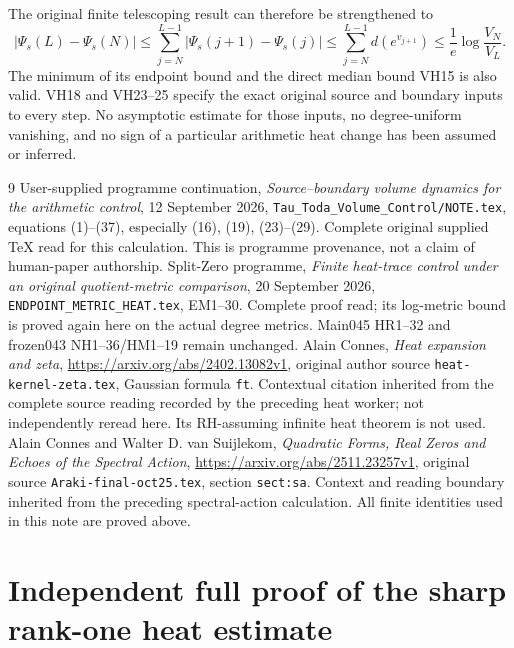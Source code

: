 The original finite telescoping result can therefore be strengthened to
\begin{equation}\tag{VH31}\label{hvh:VH31}
|\Psi_s(L)-\Psi_s(N)|\le
\sum_{j=N}^{L-1}|\Psi_s(j+1)-\Psi_s(j)|
\le\sum_{j=N}^{L-1}d(e^{v_{j+1}})
\le\frac1e\log\frac{V_N}{V_L}.
\end{equation}
The minimum of its endpoint bound and the direct median bound VH15 is
also valid. VH18 and VH23--25 specify the exact original source and
boundary inputs to every step. No asymptotic estimate for those inputs,
no degree-uniform vanishing, and no sign of a particular arithmetic
heat change has been assumed or inferred.

\begin{thebibliography}{9}
 User-supplied programme continuation,
\emph{Source--boundary volume dynamics for the arithmetic control},
12 September 2026, \texttt{Tau\_Toda\_Volume\_Control/NOTE.tex},
equations (1)--(37), especially (16), (19), (23)--(29).
Complete original supplied TeX read for this calculation. This is
programme provenance, not a claim of human-paper authorship.
 Split-Zero programme,
\emph{Finite heat-trace control under an original quotient-metric comparison},
20 September 2026, \texttt{ENDPOINT\_METRIC\_HEAT.tex}, EM1--30.
Complete proof read; its log-metric bound is proved again here on the
actual degree metrics. Main045 HR1--32 and frozen043 NH1--36/HM1--19
remain unchanged.
 Alain Connes, \emph{Heat expansion and zeta},
\url{https://arxiv.org/abs/2402.13082v1}, original author source
\texttt{heat-kernel-zeta.tex}, Gaussian formula \texttt{ft}.
Contextual citation inherited from the complete source reading recorded
by the preceding heat worker; not independently reread here. Its
RH-assuming infinite heat theorem is not used.
 Alain Connes and Walter D. van Suijlekom,
\emph{Quadratic Forms, Real Zeros and Echoes of the Spectral Action},
\url{https://arxiv.org/abs/2511.23257v1}, original source
\texttt{Araki-final-oct25.tex}, section \texttt{sect:sa}.
Context and reading boundary inherited from the preceding spectral-action
calculation. All finite identities used in this note are proved above.
\end{thebibliography}

\endgroup

\clearpage\begingroup
\part*{Independent full proof of the sharp rank-one heat estimate}
\newtheorem{hrktheorem}{Theorem}
\newtheorem{hrklemma}{Lemma}
\newtheorem{hrkcorollary}{Corollary}
\newcommand{\hrktr}{\operatorname{tr}}
\newcommand{\hrkrank}{\operatorname{rank}}
\newcommand{\hrkran}{\operatorname{ran}}
\newcommand{\hrkdiag}{\operatorname{diag}}



